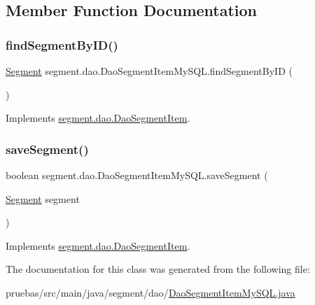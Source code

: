 \subsection{Member Function Documentation}
\mbox{\label{classsegment_1_1dao_1_1_dao_segment_item_my_s_q_l_aa448b5ac94351b927a9b8b4da988d55a}} 
\subsubsection{\texorpdfstring{find\+Segment\+By\+I\+D()}{findSegmentByID()}}
{\footnotesize\ttfamily \mbox{\hyperlink{classclases_1_1_segment}{Segment}} segment.\+dao.\+Dao\+Segment\+Item\+My\+S\+Q\+L.\+find\+Segment\+By\+ID (\begin{DoxyParamCaption}{ }\end{DoxyParamCaption})}



Implements \mbox{\hyperlink{interfacesegment_1_1dao_1_1_dao_segment_item_ab347059b047c0c014ca50b38055673a5}{segment.\+dao.\+Dao\+Segment\+Item}}.

\mbox{\label{classsegment_1_1dao_1_1_dao_segment_item_my_s_q_l_a094dab67038c9f56c9bafc9a596109dc}} 
\subsubsection{\texorpdfstring{save\+Segment()}{saveSegment()}}
{\footnotesize\ttfamily boolean segment.\+dao.\+Dao\+Segment\+Item\+My\+S\+Q\+L.\+save\+Segment (\begin{DoxyParamCaption}\item[{\mbox{\hyperlink{classclases_1_1_segment}{Segment}}}]{segment }\end{DoxyParamCaption})}



Implements \mbox{\hyperlink{interfacesegment_1_1dao_1_1_dao_segment_item_a1535dcb8477f7ab96c81041d8c86ba35}{segment.\+dao.\+Dao\+Segment\+Item}}.



The documentation for this class was generated from the following file\+:\begin{DoxyCompactItemize}
\item 
pruebas/src/main/java/segment/dao/\mbox{\hyperlink{_dao_segment_item_my_s_q_l_8java}{Dao\+Segment\+Item\+My\+S\+Q\+L.\+java}}\end{DoxyCompactItemize}
